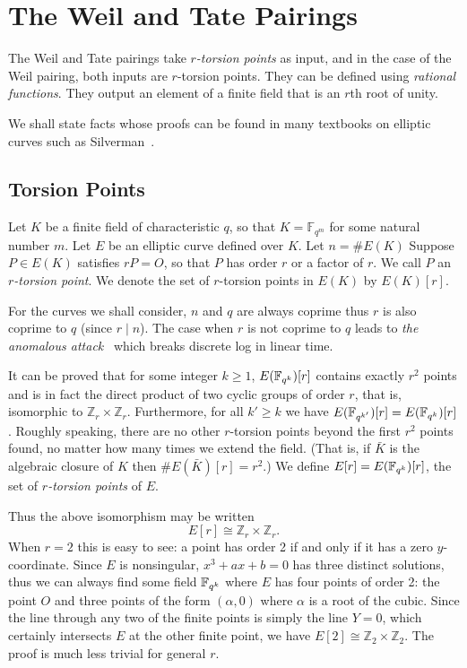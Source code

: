 \chapter {The Weil and Tate Pairings}

The Weil and Tate pairings take \emph{$r$-torsion points}
as input, and in the case of the Weil pairing, both inputs are
$r$-torsion points.
They can be defined using \emph{rational functions}.
They output an element of a finite field that is an $r$th root of unity.

We shall state facts whose proofs can be found in
many textbooks on elliptic curves such as Silverman~\cite{silverman}.

\section {Torsion Points}

Let $K$ be a finite field of characteristic $q$, so that
$K = \mathbb{F}_{q^m}$ for some natural number $m$.
Let $E$ be an elliptic curve defined
over $K$. Let $n=\#E(K)$
Suppose $P\in E(K)$ satisfies $r P = O$, so that $P$ has order $r$ or a
factor of $r$.
We call $P$ an \emph{$r$-torsion point}.
We denote the set of $r$-torsion points in $E(K)$ by
$E(K)[r]$.

For the curves we shall consider,
$n$ and $q$ are always coprime thus $r$ is also coprime to $q$
(since $r \mid n$).
The case when $r$ is not coprime
to $q$ leads to \emph{the anomalous attack}~\cite[Section V.3]{bss}
which breaks discrete log in linear time.

It can be proved that for some integer $k \ge 1$,
$E(\mathbb{F}_{q^k})[r]$ contains exactly $r^2$ points and is in fact the direct product
of two cyclic groups of order $r$, that is, isomorphic to
$\mathbb{Z}_r \times \mathbb{Z}_r$.
Furthermore, for all $k' \ge k$ we have $E(\mathbb{F}_{q^{k'}})[r]
= E(\mathbb{F}_{q^k})[r]$.
Roughly speaking, there are no other $r$-torsion points beyond the
first $r^2$ points found, no matter how many times we extend the field.
(That is, if $\bar{K}$ is the algebraic closure of $K$ then $\#E(\bar{K})[r] = r^2$.)
We define $E[r] = E(\mathbb{F}_{q^k})[r]$, the set of
\emph{$r$-torsion points} of $E$.

Thus the above isomorphism may be written
\[ E[r] \cong \mathbb{Z}_r \times \mathbb{Z}_r . \]
When $r=2$ this is easy to see: a point has order 2 if and only if it has
a zero $y$-coordinate. Since $E$ is nonsingular,
$x^3 + ax + b = 0$ has three distinct solutions, thus we can always find
some field $\mathbb{F}_{q^k}$ where $E$ has
four points of order 2: the point $O$ and three points of the form
$(\alpha, 0)$ where $\alpha$ is a root of the cubic.
Since the line through any two of the finite points is simply the line $Y = 0$,
which certainly intersects $E$ at the other finite point, we have
$E[2] \cong \mathbb{Z}_2 \times \mathbb{Z}_2$.
The proof is much less trivial for general $r$.

